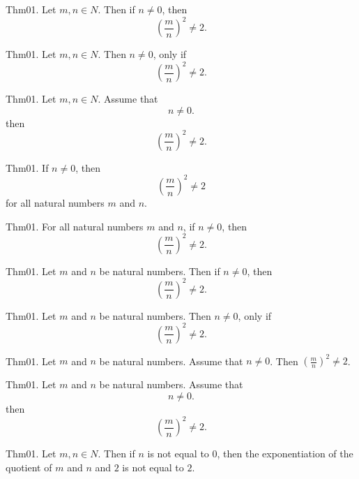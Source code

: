 \documentclass{article}
\begin{document}
Thm01. Let $m , n \in N$. Then if $n \neq 0$, then $$(\frac{ m}{n})^ {2}\neq 2.$$

Thm01. Let $m , n \in N$. Then $n \neq 0$, only if $$(\frac{ m}{n})^ {2}\neq 2.$$

Thm01. Let $m , n \in N$. Assume that $$n \neq 0.$$ then $$(\frac{ m}{n})^ {2}\neq 2.$$

Thm01. If $n \neq 0$, then $$(\frac{ m}{n})^ {2}\neq 2$$ for all natural numbers $m$ and $n$.

Thm01. For all natural numbers $m$ and $n$, if $n \neq 0$, then $$(\frac{ m}{n})^ {2}\neq 2.$$

Thm01. Let $m$ and $n$ be natural numbers. Then if $n \neq 0$, then $$(\frac{ m}{n})^ {2}\neq 2.$$

Thm01. Let $m$ and $n$ be natural numbers. Then $n \neq 0$, only if $$(\frac{ m}{n})^ {2}\neq 2.$$

Thm01. Let $m$ and $n$ be natural numbers. Assume that $n \neq 0$. Then $(\frac{ m}{n})^ {2}\neq 2$.

Thm01. Let $m$ and $n$ be natural numbers. Assume that $$n \neq 0.$$ then $$(\frac{ m}{n})^ {2}\neq 2.$$

Thm01. Let $m , n \in N$. Then if $n$ is not equal to $0$, then the exponentiation of the quotient of $m$ and $n$ and $2$ is not equal to $2$.
\end{document}

